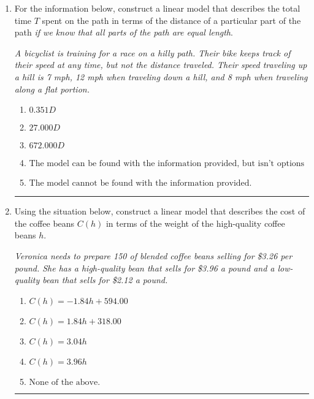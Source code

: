 \documentclass[14pt]{extbook}
\newcommand{\litem}[1]{\item#1\hspace*{-1cm}\rule{\textwidth}{0.4pt}}
\begin{document}
\begin{enumerate}
{\begin{enumerate}[label=\Alph*.]
\end{enumerate} }
\litem{
For the information below, construct a linear model that describes the total time $T$ spent on the path in terms of the distance of a particular part of the path \textit{if we know that all parts of the path are equal length}.
\begin{center}
    \textit{ A bicyclist is training for a race on a hilly path. Their bike keeps track of their speed at any time, but not the distance traveled. Their speed traveling up a hill is 7 mph, 12 mph when traveling down a hill, and 8 mph when traveling along a flat portion. }
\end{center}
\begin{enumerate}[label=\Alph*.]
\item \( 0.351 D \)
\item \( 27.000 D \)
\item \( 672.000 D \)
\item \( \text{The model can be found with the information provided, but isn't options 1-3.} \)
\item \( \text{The model cannot be found with the information provided.} \)

\end{enumerate} }
\litem{
Using the situation below, construct a linear model that describes the cost of the coffee beans $C(h)$ in terms of the weight of the high-quality coffee beans $h$.
\begin{center}
    \textit{ Veronica needs to prepare 150 of blended coffee beans selling for \$3.26 per pound. She has a high-quality bean that sells for \$3.96 a pound and a low-quality bean that sells for \$2.12 a pound. }
\end{center}
\begin{enumerate}[label=\Alph*.]
\item \( C(h) = -1.84 h + 594.00 \)
\item \( C(h) = 1.84 h + 318.00 \)
\item \( C(h) = 3.04 h \)
\item \( C(h) = 3.96 h \)
\item \( \text{None of the above.} \)


\end{enumerate}}
\end{enumerate}
\end{document}
